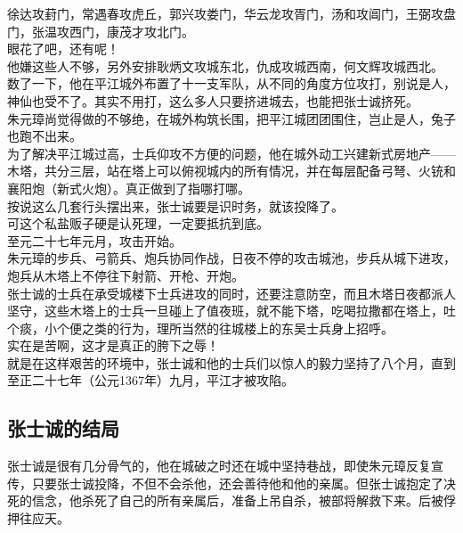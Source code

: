 \begin{multicols}{\theparacolNo}
徐达攻葑门，常遇春攻虎丘，郭兴攻娄门，华云龙攻胥门，汤和攻阊门，王弼攻盘门，张温攻西门，康茂才攻北门。\\

眼花了吧，还有呢！\\

他嫌这些人不够，另外安排耿炳文攻城东北，仇成攻城西南，何文辉攻城西北。\\

数了一下，他在平江城外布置了十一支军队，从不同的角度方位攻打，别说是人，神仙也受不了。其实不用打，这么多人只要挤进城去，也能把张士诚挤死。\\

朱元璋尚觉得做的不够绝，在城外构筑长围，把平江城团团围住，岂止是人，兔子也跑不出来。\\

为了解决平江城过高，士兵仰攻不方便的问题，他在城外动工兴建新式房地产——木塔，共分三层，站在塔上可以俯视城内的所有情况，并在每层配备弓弩、火铳和襄阳炮（新式火炮）。真正做到了指哪打哪。\\

按说这么几套行头摆出来，张士诚要是识时务，就该投降了。\\

可这个私盐贩子硬是认死理，一定要抵抗到底。\\

至元二十七年元月，攻击开始。\\

朱元璋的步兵、弓箭兵、炮兵协同作战，日夜不停的攻击城池，步兵从城下进攻，炮兵从木塔上不停往下射箭、开枪、开炮。\\

张士诚的士兵在承受城楼下士兵进攻的同时，还要注意防空，而且木塔日夜都派人坚守，这些木塔上的士兵一旦碰上了值夜班，就不能下塔，吃喝拉撒都在塔上，吐个痰，小个便之类的行为，理所当然的往城楼上的东吴士兵身上招呼。\\

实在是苦啊，这才是真正的胯下之辱！\\

就是在这样艰苦的环境中，张士诚和他的士兵们以惊人的毅力坚持了八个月，直到至正二十七年（公元1367年）九月，平江才被攻陷。\\

\subsection{张士诚的结局}
张士诚是很有几分骨气的，他在城破之时还在城中坚持巷战，即使朱元璋反复宣传，只要张士诚投降，不但不会杀他，还会善待他和他的亲属。但张士诚抱定了决死的信念，他杀死了自己的所有亲属后，准备上吊自杀，被部将解救下来。后被俘押往应天。\\


\end{multicols}

